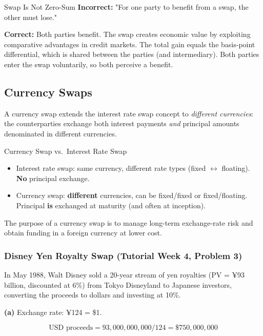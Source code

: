 \documentclass[11pt,a4paper]{article}
\begin{document}
\begin{mistakebox}{Swap Is Not Zero-Sum}
\textbf{Incorrect:} "For one party to benefit from a swap, the other must lose."

\textbf{Correct:} Both parties benefit. The swap creates economic value by exploiting comparative advantages in credit markets. The total gain equals the basis-point differential, which is shared between the parties (and intermediary). Both parties enter the swap voluntarily, so both perceive a benefit.
\end{mistakebox}

\subsection{Currency Swaps}

A currency swap extends the interest rate swap concept to \textit{different currencies}: the counterparties exchange both interest payments \textit{and} principal amounts denominated in different currencies.

\begin{conceptbox}{Currency Swap vs.\ Interest Rate Swap}
\begin{itemize}
  \item Interest rate swap: same currency, different rate types (fixed $\leftrightarrow$ floating). \textbf{No} principal exchange.
  \item Currency swap: \textbf{different} currencies, can be fixed/fixed or fixed/floating. Principal \textbf{is} exchanged at maturity (and often at inception).
\end{itemize}
The purpose of a currency swap is to manage long-term exchange-rate risk and obtain funding in a foreign currency at lower cost.
\end{conceptbox}

\subsubsection{Disney Yen Royalty Swap (Tutorial Week 4, Problem 3)}

In May 1988, Walt Disney sold a 20-year stream of yen royalties (PV = ¥93 billion, discounted at 6\%) from Tokyo Disneyland to Japanese investors, converting the proceeds to dollars and investing at 10\%.

\textbf{(a)} Exchange rate: ¥124 = \$1.

\[
  \text{USD proceeds} = 93{,}000{,}000{,}000 / 124 = \$750{,}000{,}000
\]
\end{document}

